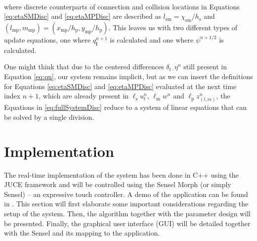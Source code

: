 \documentclass[dvipsnames, pdftex]{article}
\def\SWcomment[#1]{\textcolor{Bittersweet}{#1}}
\def\stringx{\chi}
\def\ugen{q}
\def\us{u}
\def\um{w}
\def\up{z}
\begin{document}
\\
where discrete counterparts of connection and collision locations in Equations \eqref{eq:etaSMDisc} and \eqref{eq:etaMPDisc} are described as $l_\text{sm} = \stringx_\text{sm}/h_\text{s}$ and $(l_\text{mp}, m_\text{mp}) = (x_\text{mp}/h_\text{p}, y_\text{mp}/h_\text{p})$. This leaves us with two different types of update equations, one where $\ugen^{n+1}_{\boldsymbol{l}}$ is calculated and one where $\psi^{n+1/2}$ is calculated.

One might think that due to the centered differences $\delta_{t\cdot}\eta^n$ still present in Equation \eqref{eq:qn}, our system remains implicit, but as we can insert the definitions for Equations \eqref{eq:etaSMDisc} and \eqref{eq:etaMPDisc} evaluated at the next time index $n+1$, which are already present in $\ell_\text{s}\us_l^n$, $\ell_\text{m}\um^n$ and $\ell_\text{p}\up_{(l,m)}^n$, the Equations in \eqref{eq:fullSystemDisc} reduce to a system of linear equations that can be solved by a single division. %

\section{Implementation}\label{sec:implementation}
The real-time implementation of the system has been done in C++ using the JUCE framework \cite{JUCE2020} and will be controlled using the Sensel Morph (or simply Sensel) -- an expressive touch controller. A demo of the application can be found in \cite{youtubeDemo:SMC2020}. This section will first elaborate some important considerations regarding the setup of the system. Then, the algorithm together with the parameter design will be presented.  Finally, the graphical user interface (GUI) will be detailed together with the Sensel and its mapping to the application.
\end{document}
